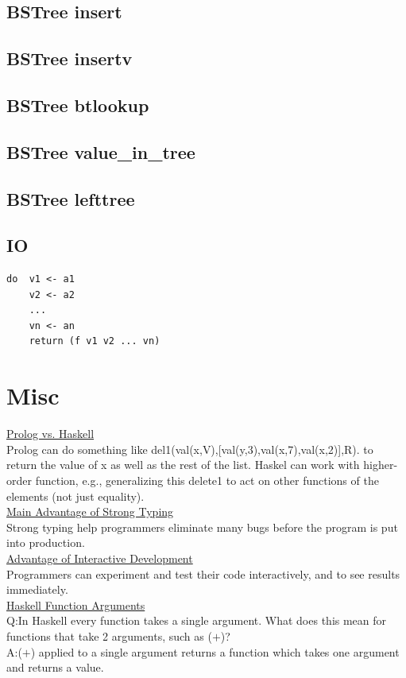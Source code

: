 \documentclass[10pt,landscape,a4paper]{article}
\begin{document}
\begin{multicols*}{5}
\subsection*{BSTree insert}

\subsection*{BSTree insertv}

\subsection*{BSTree btlookup}

\subsection*{BSTree value_in_tree}

\subsection*{BSTree lefttree}

\subsection*{IO}
\begin{verbatim}
do  v1 <- a1
    v2 <- a2
    ...
    vn <- an
    return (f v1 v2 ... vn)
\end{verbatim}

\section{Misc}
\underline{Prolog vs. Haskell} \\
Prolog can do something like del1(val(x,V),[val(y,3),val(x,7),val(x,2)],R). to return the value of x as well as the rest of the list. Haskel can work with higher-order function, e.g., generalizing this delete1 to act on other functions of the elements (not just equality). \\
\underline{Main Advantage of Strong Typing} \\
Strong typing help programmers eliminate many bugs before the program is put into production. \\
\underline{Advantage of Interactive Development} \\
Programmers can experiment and test their code interactively, and to see results immediately. \\
\underline{Haskell Function Arguments} \\
Q:\@ In Haskell every function takes a single argument. What does this mean for functions that take 2 arguments, such as (\(+\))? \\
A:\@ (\(+\)) applied to a single argument returns a function which takes one argument and returns a value.

\end{multicols*}
\end{document}
